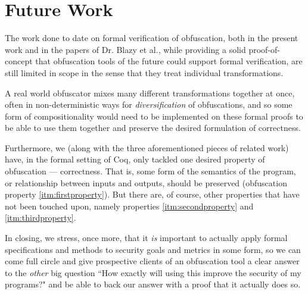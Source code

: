\documentclass[compsoc,conference,a4paper,10pt,times]{IEEEtran}
\begin{document}
\section{Future Work}
The work done to date on formal verification of obfuscation, both in the present work and in the papers of Dr. Blazy et al., while providing a solid proof-of-concept that obfuscation tools of the future could support formal verification, are still limited in scope in the sense that they treat individual transformations.
\par A real world obfuscator mixes many different transformations together at once, often in non-deterministic ways for \emph{diversification} of obfuscations, and so some form of compositionality would need to be implemented on these formal proofs to be able to use them together and preserve the desired formulation of correctness. 
\par Furthermore, we (along with the three aforementioned pieces of related work) have, in the formal setting of Coq, only tackled one desired property of obfuscation --- correctness.  That is, some form of the semantics of the program, or relationship between inputs and outputs, should be preserved (obfuscation property \ref{itm:firstproperty}). But there are, of course, other properties that have not been touched upon, namely properties \ref{itm:secondproperty} and \ref{itm:thirdproperty}.
\par In closing, we stress, once more, that it \emph{is} important to actually apply formal specifications and methods to security goals and metrics in some form, so we can come full circle and give prospective clients of an obfuscation tool a clear answer to the \emph{other} big question ``How exactly will using this improve the security of my programs?" and be able to back our answer with a proof that it actually does so.
\end{document}
